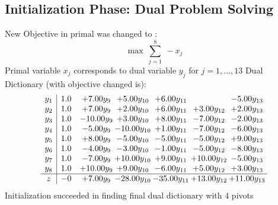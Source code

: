 \documentclass[9pt]{article}
\begin{document}
\subsection{Initialization Phase: Dual Problem Solving}
New Objective in primal was changed to : \[ \max\ \sum_{j=1}^{8}\ - x_j \] 
Primal variable $x_j$ corresponds to dual variable $y_j$ for $j = 1,\ldots,13$
Dual Dictionary (with objective changed is): 
\[\begin{array}{c| c c@{\hskip 2pt} c@{\hskip 2pt} c@{\hskip 2pt} c@{\hskip 2pt} c@{\hskip 2pt} }
 y_{1}   &  1.0 & +  7.00 y_{9} & +  5.00 y_{10} & +  6.00 y_{11} &   & -5.00 y_{13}\\
 y_{2}   &  1.0 & +  7.00 y_{9} & +  2.00 y_{10} & +  6.00 y_{11} & +  3.00 y_{12} & +  2.00 y_{13}\\
 y_{3}   &  1.0 & -10.00 y_{9} & +  3.00 y_{10} & +  8.00 y_{11} & -7.00 y_{12} & -2.00 y_{13}\\
 y_{4}   &  1.0 & -5.00 y_{9} & -10.00 y_{10} & +  1.00 y_{11} & -7.00 y_{12} & -6.00 y_{13}\\
 y_{5}   &  1.0 & +  8.00 y_{9} & -5.00 y_{10} & -5.00 y_{11} & -5.00 y_{12} & +  9.00 y_{13}\\
 y_{6}   &  1.0 & -4.00 y_{9} & -3.00 y_{10} & -1.00 y_{11} & -5.00 y_{12} & -8.00 y_{13}\\
 y_{7}   &  1.0 & -7.00 y_{9} & + 10.00 y_{10} & +  9.00 y_{11} & + 10.00 y_{12} & -5.00 y_{13}\\
 y_{8}   &  1.0 & + 10.00 y_{9} & +  9.00 y_{10} & -6.00 y_{11} & +  5.00 y_{12} & +  3.00 y_{13}\\
\hline
z    &  -0 & +  7.00 y_{9} & -28.00 y_{10} & -35.00 y_{11} & + 13.00 y_{12} & + 11.00 y_{13}\\
\end{array}\]
Initialization succeeded in finding final dual dictionary with 4 pivots
\end{document}
